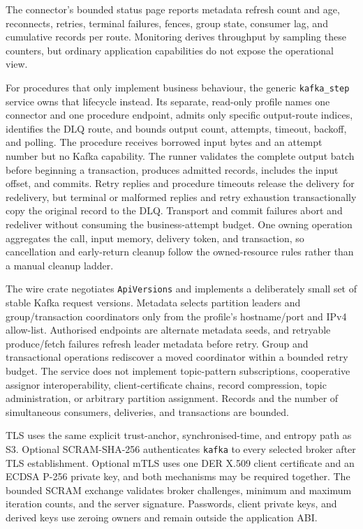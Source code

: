 The connector's bounded status page reports metadata refresh count and age,
reconnects, retries, terminal failures, fences, group state, consumer lag, and
cumulative records per route. Monitoring derives throughput by sampling these
counters, but ordinary application capabilities do not expose the operational view.

For procedures that only implement business behaviour, the generic
\texttt{kafka\_step} service owns that lifecycle instead. Its separate,
read-only profile names one connector and one procedure endpoint, admits only
specific output-route indices, identifies the DLQ route, and bounds output
count, attempts, timeout, backoff, and polling. The procedure receives borrowed
input bytes and an attempt number but no Kafka capability. The runner validates
the complete output batch before beginning a transaction, produces admitted
records, includes the input offset, and commits. Retry replies and procedure
timeouts release the delivery for redelivery, but terminal or malformed replies
and retry exhaustion transactionally copy the original record to the DLQ.
Transport and commit failures abort and redeliver without consuming the
business-attempt budget. One owning operation aggregates the call, input
memory, delivery token, and transaction, so cancellation and early-return
cleanup follow the owned-resource rules rather than a manual cleanup ladder.

The wire crate negotiates \texttt{ApiVersions} and implements a deliberately
small set of stable Kafka request versions. Metadata selects partition leaders
and group/transaction coordinators only from the profile's hostname/port and
IPv4 allow-list. Authorised endpoints are alternate metadata seeds, and
retryable produce/fetch failures refresh leader metadata before retry.
Group and transactional operations rediscover a moved coordinator within a
bounded retry budget. The service does not implement topic-pattern
subscriptions, cooperative assignor interoperability, client-certificate
chains, record compression, topic administration, or arbitrary partition
assignment. Records and the number of simultaneous consumers, deliveries,
and transactions are bounded.

TLS uses the same explicit trust-anchor, synchronised-time, and entropy path as
S3. Optional SCRAM-SHA-256 authenticates \texttt{kafka} to every selected broker
after TLS establishment. Optional mTLS uses one DER X.509 client certificate
and an ECDSA P-256 private key, and both mechanisms may be required together. The
bounded SCRAM exchange validates broker challenges, minimum and maximum
iteration counts, and the server signature. Passwords, client private keys,
and derived keys use zeroing owners and remain outside the application ABI.

